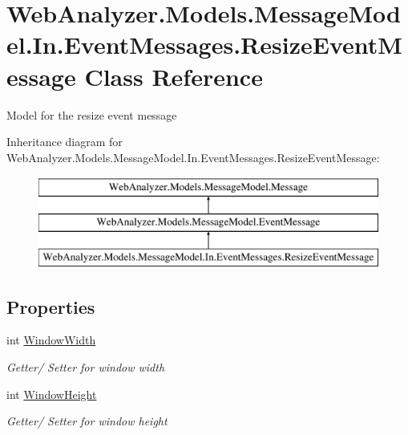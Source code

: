 \hypertarget{class_web_analyzer_1_1_models_1_1_message_model_1_1_in_1_1_event_messages_1_1_resize_event_message}{}\section{Web\+Analyzer.\+Models.\+Message\+Model.\+In.\+Event\+Messages.\+Resize\+Event\+Message Class Reference}
\label{class_web_analyzer_1_1_models_1_1_message_model_1_1_in_1_1_event_messages_1_1_resize_event_message}


Model for the resize event message  


Inheritance diagram for Web\+Analyzer.\+Models.\+Message\+Model.\+In.\+Event\+Messages.\+Resize\+Event\+Message\+:\begin{figure}[H]
\begin{center}
\leavevmode
\includegraphics[height=3.000000cm]{class_web_analyzer_1_1_models_1_1_message_model_1_1_in_1_1_event_messages_1_1_resize_event_message}
\end{center}
\end{figure}
\subsection*{Properties}
\begin{DoxyCompactItemize}
\item 
int \hyperlink{class_web_analyzer_1_1_models_1_1_message_model_1_1_in_1_1_event_messages_1_1_resize_event_message_a71924d047ccc6fbc74445e8a4b291e85}{Window\+Width}
\begin{DoxyCompactList}\small\item\em Getter/ Setter for window width \end{DoxyCompactList}\item 
int \hyperlink{class_web_analyzer_1_1_models_1_1_message_model_1_1_in_1_1_event_messages_1_1_resize_event_message_a24184b701063ace4ecf8f00d2e68056f}{Window\+Height}
\begin{DoxyCompactList}\small\item\em Getter/ Setter for window height \end{DoxyCompactList}\end{DoxyCompactItemize}
